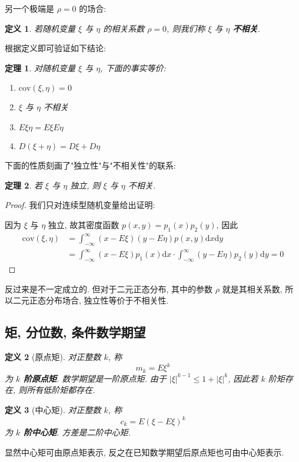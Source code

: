 \documentclass[12pt,a4paper]{article}
\newtheorem{thm}{定理}[subsection]  %
\newtheorem{definition}{定义}[subsection] %
\begin{document}
另一个极端是 $\rho = 0$ 的场合:
\begin{definition}
    若随机变量 $\xi$ 与 $\eta$ 的相关系数 $\rho = 0$, 则我们称 $\xi$ 与 $\eta$ \textbf{不相关}.
\end{definition}
根据定义即可验证如下结论:
\begin{thm}
    对随机变量 $\xi$ 与 $\eta$, 下面的事实等价:
    \begin{enumerate}[label=(\roman*),font=\upshape]
        \item $\mathrm{cov}(\xi, \eta) = 0$
        \item $\xi$ 与 $\eta$ 不相关
        \item $E\xi\eta = E\xi E\eta$
        \item $D(\xi+\eta) = D\xi + D\eta$
    \end{enumerate}
\end{thm}
下面的性质刻画了"独立性"与"不相关性"的联系:
\begin{thm}
    若 $\xi$ 与 $\eta$ 独立, 则 $\xi$ 与 $\eta$ 不相关.
\end{thm}
\begin{proof}
    我们只对连续型随机变量给出证明:

    因为 $\xi$ 与 $\eta$ 独立, 故其密度函数 $p(x,y) = p_1(x)p_2(y)$, 因此
    \[\begin{aligned}
        \mathrm{cov}(\xi,\eta) & = \int_{-\infty}^{\infty} (x-E\xi)(y-E\eta)p(x,y) \mathrm{d}x\mathrm{d}y \\
        & = \int_{-\infty}^{\infty} (x-E\xi)p_1(x) \mathrm{d}x \cdot \int_{-\infty}^{\infty} (y - E\eta)p_2(y) \mathrm{d}y = 0
    \end{aligned}\]
\end{proof}
反过来是不一定成立的. 但对于二元正态分布, 其中的参数 $\rho$ 就是其相关系数, 所以二元正态分布场合, 独立性等价于不相关性.
\subsection{矩, 分位数, 条件数学期望}

\begin{definition}[原点矩]
    对正整数 $k$, 称 \[m_k = E \xi^k\] 为\textbf{ $k$ 阶原点矩}. 数学期望是一阶原点矩. 由于 $|\xi|^{k-1} \leq 1 + |\xi|^k$, 
    因此若 $k$ 阶矩存在, 则所有低阶矩都存在.
\end{definition}

\begin{definition}[中心矩]
    对正整数 $k$, 称 \[c_k = E(\xi - E\xi)^k\] 为 \textbf{$k$ 阶中心矩}. 方差是二阶中心矩.
\end{definition}
显然中心矩可由原点矩表示, 反之在已知数学期望后原点矩也可由中心矩表示.
\end{document}
